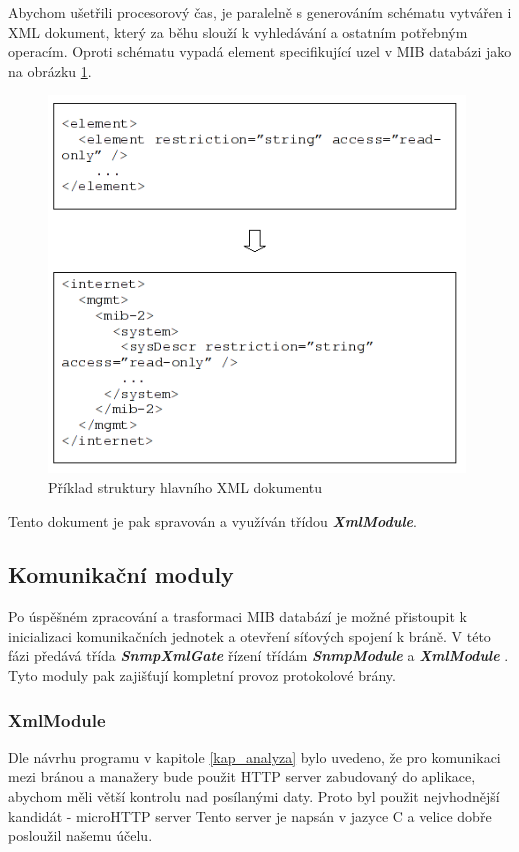 Abychom ušetřili procesorový čas, je paralelně s generováním schématu vytvářen i XML dokument, který za běhu slouží k vyhledávání a ostatním potřebným
operacím. Oproti schématu vypadá element specifikující uzel v MIB databázi jako na obrázku \ref{obr_impl_xml_element}.
\begin{figure}[htp]
	\begin{center}
		\includegraphics[height=10cm]{obrazky/05_element_xml.png}
		\caption{Příklad struktury hlavního XML dokumentu}
		\label{obr_impl_xml_element}
	\end{center}
\end{figure}

Tento dokument je pak spravován a využíván třídou \textit{\textbf{XmlModule}}.


\subsection{Komunikační moduly}
Po úspěšném zpracování a trasformaci MIB databází je možné přistoupit k inicializaci komunikačních jednotek a otevření síťových spojení k bráně.
V této fázi předává třída \textit{ \textbf{SnmpXmlGate} } řízení třídám \textit{ \textbf{SnmpModule} } a \textit{ \textbf{XmlModule} }. Tyto
moduly pak zajišťují kompletní provoz protokolové brány.

\subsubsection*{XmlModule}
\label{kap_impl_xmlmod}
Dle návrhu programu v kapitole \ref{kap_analyza} bylo uvedeno, že pro komunikaci mezi bránou a manažery bude použit HTTP server zabudovaný do
aplikace, abychom měli větší kontrolu nad posílanými daty. Proto byl použit nejvhodnější kandidát - microHTTP server %
Tento server je napsán v jazyce C a velice dobře posloužil našemu účelu. 

